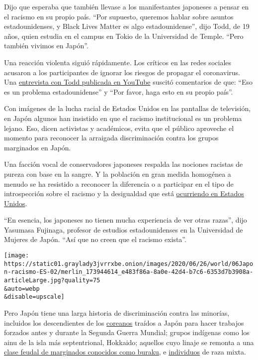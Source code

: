 Dijo que esperaba que también llevase a los manifestantes japoneses a
pensar en el racismo en su propio país. ``Por supuesto, queremos hablar
sobre asuntos estadounidenses, y Black Lives Matter es algo
estadounidense'', dijo Todd, de 19 años, quien estudia en el campus en
Tokio de la Universidad de Temple. ``Pero también vivimos en Japón''.

Una reacción violenta siguió rápidamente. Los críticos en las redes
sociales acusaron a los participantes de ignorar los riesgos de propagar
el coronavirus. Una
\href{https://www.youtube.com/watch?v=ucdbcHod9iU}{entrevista con Todd
publicada en YouTube} suscitó comentarios de que: ``Eso es un problema
estadounidense'' y ``Por favor, haga esto en su propio país''.

Con imágenes de la lucha racial de Estados Unidos en las pantallas de
televisión, en Japón algunos han insistido en que el racismo
institucional es un problema lejano. Eso, dicen activistas y académicos,
evita que el público aproveche el momento para reconocer la arraigada
discriminación contra los grupos marginados en Japón.

Una facción vocal de conservadores japoneses respalda las nociones
racistas de pureza con base en la sangre. Y la población en gran medida
homogénea a menudo se ha resistido a reconocer la diferencia o a
participar en el tipo de introspección sobre el racismo y la desigualdad
que está
\href{https://www.nytimes3xbfgragh.onion/2020/06/22/us/racism-white-americans.html?action=click\&module=Top\%20Stories\&pgtype=Homepage}{ocurriendo
en Estados Unidos}.

``En esencia, los japoneses no tienen mucha experiencia de ver otras
razas'', dijo Yasumasa Fujinaga, profesor de estudios estadounidenses en
la Universidad de Mujeres de Japón. ``Así que no creen que el racismo
exista''.

\texttt{[image: https://static01.graylady3jvrrxbe.onion/images/2020/06/26/world/06Japon-racismo-ES-02/merlin\_173944614\_e483f86a-8a0e-42d4-b7c6-6353d7b3908a-articleLarge.jpg?quality=75\\\&auto=webp\\\&disable=upscale]}

Pero Japón tiene una larga historia de discriminación contra las
minorías, incluidos los descendientes de los
\href{https://www.nytimes3xbfgragh.onion/2019/02/25/world/asia/korea-japan-diaspora.html}{coreanos}
traídos a Japón para hacer trabajos forzados antes y durante la Segunda
Guerra Mundial; grupos indígenas como los ainu de la isla más
septentrional, Hokkaido; aquellos cuyo linaje se remonta a una
\href{https://www.nytimes3xbfgragh.onion/2009/01/16/world/asia/16outcasts.html}{clase
feudal de marginados conocidos como buraku}, e
\href{https://www.nytimes3xbfgragh.onion/2015/05/30/world/asia/biracial-beauty-queen-strives-for-change-in-mono-ethnic-japan.html}{individuos}
de raza mixta.

